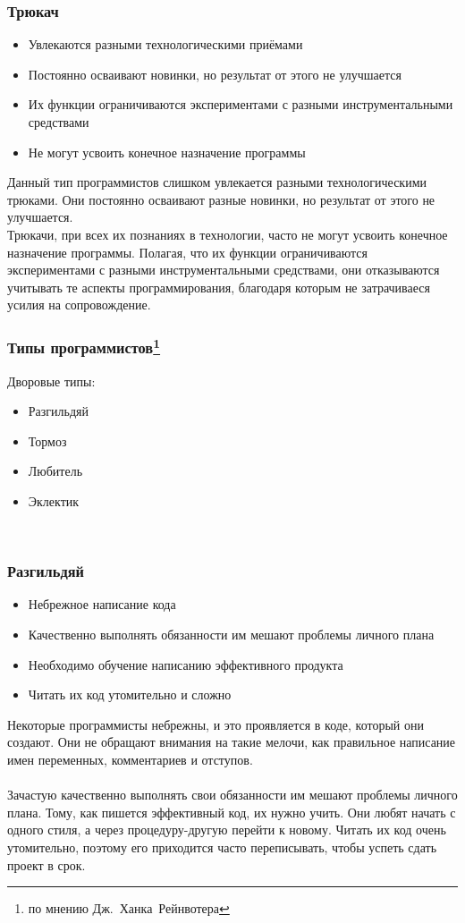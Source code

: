 \documentclass{../industrial-development}
\begin{document}
{\begin{frame} \frametitle{Трюкач}
	\begin{itemize}
		\item Увлекаются разными технологическими приёмами
		\item Постоянно осваивают новинки, но результат от этого не улучшается
		\item Их функции ограничиваются экспериментами с разными инструментальными средствами
		\item Не могут усвоить конечное назначение программы
	\end{itemize}
\end{frame}
\lecturenotes
Данный тип программистов слишком увлекается разными технологическими трюками. Они постоянно осваивают разные новинки, но результат от этого не улучшается. \\ 
	Трюкачи, при всех их познаниях в технологии, часто не могут усвоить конечное назначение программы. Полагая, что их функции ограничиваются экспериментами с разными инструментальными средствами, они отказываются учитывать те аспекты программирования, благодаря которым не затрачиваеся усилия на сопровождение. 
\begin{frame} \frametitle{Типы программистов\footnote[1]{по мнению Дж.~Ханка~Рейнвотера}}
	\begin{block}{Дворовые типы:}
\begin{itemize}
\item Разгильдяй
\item Тормоз
\item Любитель
\item Эклектик
\end{itemize}
\end{block}
\end{frame}
\lecturenotes
~\cite{How_to_be_a_good_IT-manager}

\begin{frame} \frametitle{Разгильдяй}
	\begin{itemize}
		\item Небрежное написание кода
		\item Качественно выполнять обязанности им мешают проблемы личного плана
		\item Необходимо обучение написанию эффективного продукта
		\item Читать их код утомительно и сложно
	\end{itemize}	 
\end{frame}
\lecturenotes
Некоторые программисты небрежны, и это проявляется в коде, который они создают. Они не обращают внимания на такие мелочи, как правильное написание имен переменных, комментариев и отступов. \\~\\
Зачастую качественно выполнять свои обязанности им мешают проблемы личного плана. Тому, как пишется эффективный код, их нужно учить. Они любят начать с одного стиля, а через процедуру-другую перейти к новому. Читать их код очень утомительно, поэтому его приходится часто переписывать, чтобы успеть сдать проект в срок. \\

}
\end{document}
